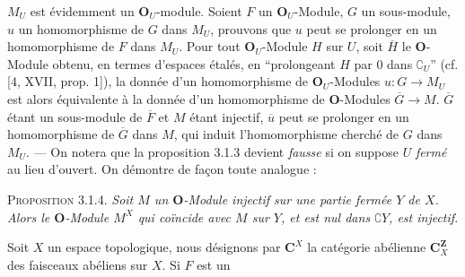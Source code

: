 $M_U$ est évidemment un $\mathbf O_U$-module. Soient $F$ un
$\mathbf O_U$-Module, $G$ un sous-module, $u$ un homomorphisme de $G$ dans
$M_U$, prouvons que $u$ peut se prolonger en un homomorphisme de $F$ dans
$M_U$. Pour tout $\mathbf O_U$-Module $H$ sur $U$, soit $\overline H$ le
$\mathbf O$-Module obtenu, en termes d'espaces étalés, en ``prolongeant $H$
par 0 dans $\complement_U$'' (cf. [4, XVII, prop. 1]), la donnée d'un homomorphisme de
$\mathbf O_U$-Modules $u:G\to M_U$ est alors équivalente à la
donnée d'un homomorphisme de $\mathbf O$-Modules
$\overline G\to M$. $\overline G$ étant un
sous-module de $\overline F$ et $M$ étant injectif, $\overline u$ peut se
prolonger en un homomorphisme de $\overline G$ dans $M$, qui induit
l'homomorphisme cherché de $G$ dans $M_U$. --- On notera que la proposition
3.1.3 devient \textit{fausse} si on suppose $U$ \textit{fermé} au lieu
d'ouvert. On démontre de façon toute analogue :

\indent\textsc{Proposition 3.1.4.} \textit{Soit $M$ un $\mathbf O$-Module
injectif sur une partie fermée $Y$ de $X$. Alors le $\mathbf O$-Module $M^X$
qui coïncide avec $M$ sur $Y$, et est nul dans $\complement Y$, est injectif.}

 Soit $X$ un espace topologique,
nous désignons par $\mathbf C^X$ la catégorie abélienne $\mathbf C^{\mathbf Z}_X$ des
faisceaux abéliens sur $X$. Si $F$ est un


